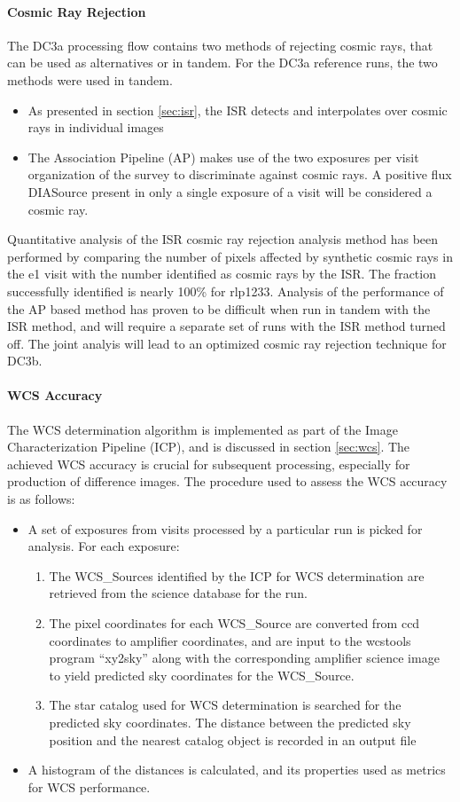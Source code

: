 \paragraph{Cosmic Ray Rejection}
The DC3a processing flow contains two methods of rejecting cosmic
rays, that can be used as alternatives or in tandem.  For the DC3a
reference runs, the two methods were used in tandem.
\begin{itemize}
\item As presented in section \ref{sec:isr}, the ISR detects and
  interpolates over cosmic rays in individual images
\item The Association Pipeline (AP) makes use of the two exposures per
  visit organization of the survey to discriminate against cosmic
  rays.  A positive flux DIASource present in only a single exposure
  of a visit will be considered a cosmic ray.
\end{itemize}
Quantitative analysis of the ISR cosmic ray rejection analysis method
has been performed by comparing the number of pixels affected by
synthetic cosmic rays in the e1 visit with the number identified as
cosmic rays by the ISR.  The fraction successfully identified is
nearly 100\% for rlp1233.  Analysis of the performance of the AP based
method has proven to be difficult when run in tandem with the ISR
method, and will require a separate set of runs with the ISR method
turned off.  The joint analyis will lead to an optimized cosmic ray
rejection technique for DC3b.
\paragraph{WCS Accuracy}
The WCS determination algorithm is implemented as part of the Image
Characterization Pipeline (ICP), and is discussed in section \ref{sec:wcs}.
The achieved WCS accuracy is crucial for subsequent processing,
especially for production of difference images.  The procedure used to
assess the WCS accuracy is as follows:
\begin{itemize}

\item A set of exposures from visits processed by a particular run is
  picked for analysis. For each exposure:
\begin{enumerate}
\item The WCS\_Sources identified by the ICP for WCS determination are retrieved from the
  science database for the run.
\item The pixel coordinates for each WCS\_Source are converted from
  ccd coordinates to amplifier coordinates, and are input to the
  wcstools program ``xy2sky'' along with the corresponding amplifier
  science image to yield predicted sky coordinates for the
  WCS\_Source.
\item The star catalog used for WCS determination is searched for the
  predicted sky coordinates.  The distance between the predicted sky
  position and the nearest catalog object is recorded in an output file
\end{enumerate}
\item A histogram of the distances is calculated, and its properties
  used as metrics for WCS performance.
\end{itemize}

